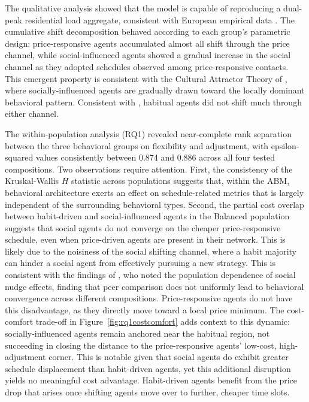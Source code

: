 \documentclass[11pt, a4paper]{article}
\begin{document}
The qualitative analysis showed that the model is capable of reproducing a dual-peak residential load aggregate, consistent with European empirical data \autocite{anvari_data-driven_2022,liander_openstefliander2024-energy-forecasting-benchmark_2024}. The cumulative shift decomposition behaved according to each group's parametric design: price-responsive agents accumulated almost all shift through the price channel, while social-influenced agents showed a gradual increase in the social channel as they adopted schedules observed among price-responsive contacts. This emergent property is consistent with the Cultural Attractor Theory of \textcite{falandays_emergence_2022}, where socially-influenced agents are gradually drawn toward the locally dominant behavioral pattern. Consistent with \textcite{haseler_promoting_2024}, habitual agents did not shift much through either channel. 

The within-population analysis (RQ1) revealed near-complete rank separation between the three behavioral groups on flexibility and adjustment, with epsilon-squared values consistently between 0.874 and 0.886 across all four tested compositions. Two observations require attention. First, the consistency of the Kruskal-Wallis $H$ statistic across populations suggests that, within the ABM, behavioral architecture exerts an effect on schedule-related metrics that is largely independent of the surrounding behavioral types. Second, the partial cost overlap between habit-driven and social-influenced agents in the Balanced population suggests that social agents do not converge on the cheaper price-responsive schedule, even when price-driven agents are present in their network. This is likely due to the noisiness of the social shifting channel, where a habit majority can hinder a social agent from effectively pursuing a new strategy. This is consistent with the findings of \textcite{mochi_social_2025}, who noted the population dependence of social nudge effects, finding that peer comparison does not uniformly lead to behavioral convergence across different compositions. Price-responsive agents do not have this disadvantage, as they directly move toward a local price minimum. The cost-comfort trade-off in Figure~\ref{fig:rq1costcomfort} adds context to this dynamic: socially-influenced agents remain anchored near the habitual region, not succeeding in closing the distance to the price-responsive agents' low-cost, high-adjustment corner. This is notable given that social agents do exhibit greater schedule displacement than habit-driven agents, yet this additional disruption yields no meaningful cost advantage. Habit-driven agents benefit from the price drop that arises once shifting agents move over to further, cheaper time slots.
\end{document}
